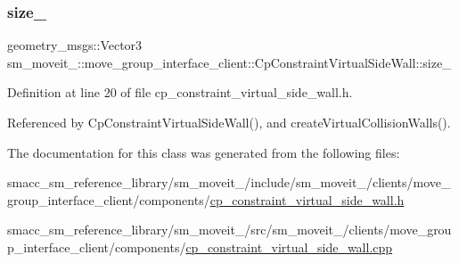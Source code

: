 \subsubsection{\texorpdfstring{size\+\_\+}{size\_}}
{\footnotesize\ttfamily geometry\+\_\+msgs\+::\+Vector3 sm\+\_\+moveit\+\_\+::move\+\_\+group\+\_\+interface\+\_\+client\+::\+Cp\+Constraint\+Virtual\+Side\+Wall\+::size\+\_\+\hspace{0.3cm}{\ttfamily [private]}}



Definition at line 20 of file cp\+\_\+constraint\+\_\+virtual\+\_\+side\+\_\+wall.\+h.



Referenced by Cp\+Constraint\+Virtual\+Side\+Wall(), and create\+Virtual\+Collision\+Walls().



The documentation for this class was generated from the following files\+:\begin{DoxyCompactItemize}
\item 
smacc\+\_\+sm\+\_\+reference\+\_\+library/sm\+\_\+moveit\+\_/include/sm\+\_\+moveit\+\_/clients/move\+\_\+group\+\_\+interface\+\_\+client/components/\hyperlink{cp__constraint__virtual__side__wall_8h}{cp\+\_\+constraint\+\_\+virtual\+\_\+side\+\_\+wall.\+h}\item 
smacc\+\_\+sm\+\_\+reference\+\_\+library/sm\+\_\+moveit\+\_/src/sm\+\_\+moveit\+\_/clients/move\+\_\+group\+\_\+interface\+\_\+client/components/\hyperlink{cp__constraint__virtual__side__wall_8cpp}{cp\+\_\+constraint\+\_\+virtual\+\_\+side\+\_\+wall.\+cpp}\end{DoxyCompactItemize}
